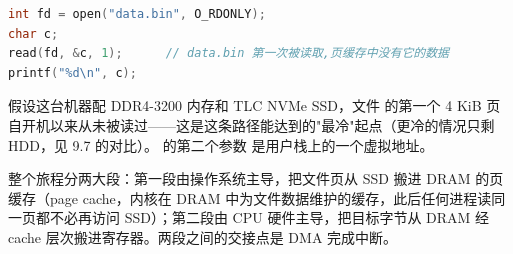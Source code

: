 
\begin{lstlisting}[language=C]
int fd = open("data.bin", O_RDONLY);
char c;
read(fd, &c, 1);      // data.bin 第一次被读取,页缓存中没有它的数据
printf("%d\n", c);
\end{lstlisting}

假设这台机器配 DDR4-3200 内存和 TLC NVMe SSD，文件  的第一个 4 KiB 页自开机以来从未被读过——这是这条路径能达到的"最冷"起点（更冷的情况只剩 HDD，见 9.7 的对比）。 的第二个参数  是用户栈上的一个虚拟地址。

整个旅程分两大段：第一段由操作系统主导，把文件页从 SSD 搬进 DRAM 的页缓存（page cache，内核在 DRAM 中为文件数据维护的缓存，此后任何进程读同一页都不必再访问 SSD）；第二段由 CPU 硬件主导，把目标字节从 DRAM 经 cache 层次搬进寄存器。两段之间的交接点是 DMA 完成中断。

